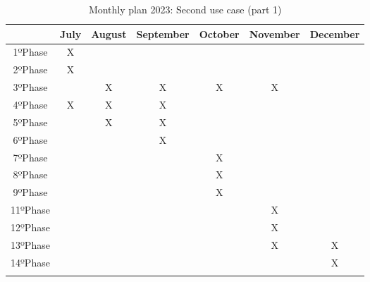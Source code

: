 \begin{longtable}{|c|c|c|c|c|c|c|}
    \hline
    & \textbf{July} & \textbf{August} & \textbf{September} & \textbf{October} & \textbf{November} & \textbf{December} \\ \hline

    1ºPhase & X & & & & & \\ \hline 

    2ºPhase & X & & & & & \\ \hline 

    3ºPhase & & X & X & X & X & \\ \hline 

    4ºPhase & X & X & X & & & \\ \hline

    5ºPhase & & X & X & & & \\ \hline

    6ºPhase & & & X & & & \\ \hline

    7ºPhase & & & & X & & \\ \hline

    8ºPhase & & & & X & & \\ \hline

    9ºPhase & & & & X & & \\ \hline 

    11ºPhase & & & & & X & \\ \hline 

    12ºPhase & & & & & X & \\ \hline 
    
    13ºPhase & & & & & X & X \\ \hline 

    14ºPhase & & & & & & X \\ \hline 
    \caption{Monthly plan 2023: Second use case (part 1)} \label{tab:activity_schedule} 
\end{longtable}

